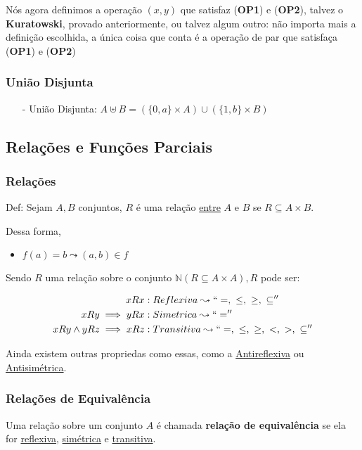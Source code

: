 \documentclass[12pt, a4paper]{article}
\begin{document}
Nós agora definimos a operação $(x,y)$ que satisfaz (\textbf{OP1}) e (\textbf{OP2}), talvez o \textbf{Kuratowski}, provado anteriormente, ou talvez algum outro: não importa mais a definição escolhida, a única coisa que conta é a operação de par que satisfaça (\textbf{OP1}) e (\textbf{OP2})

\subsubsection{União Disjunta}

\begin{itemize}
\item[-] União Disjunta: $A \uplus B = (\{0,a\} \times A) \cup (\{1,b\} \times B)$
\end{itemize}

\subsection{Relações e Funções Parciais}

\subsubsection{Relações}

Def: Sejam $A,B$ conjuntos, $R$ é uma relação \underline{entre} $A$ e $B$ se $R \subseteq A \times B$.

Dessa forma,
\begin{itemize}
\item $f(a) = b \leadsto (a,b) \in f$
\end{itemize}

Sendo $R$ uma relação sobre o conjunto $\mathbb{N} (R \subseteq A \times A), R$ pode ser:

\begin{align*}
x R x &: Reflexiva \leadsto `` =, ~\leq, ~\geq, ~\subseteq ''\\
x R y \implies  y R x  &: Simetrica \leadsto `` =  ''\\
x R y \land y R z \implies x R z &: Transitiva \leadsto  `` =, ~\leq, ~\geq, ~<, ~>, ~\subseteq ''
\end{align*}

Ainda existem outras propriedas como essas, como a \underline{Antireflexiva} ou \underline{Antisimétrica}.

\subsubsection{Relações de Equivalência}
Uma relação sobre um conjunto $A$ é chamada \textbf{relação de equivalência} se ela for \underline{reflexiva},
\underline{simétrica} e \underline{transitiva}.
\end{document}
